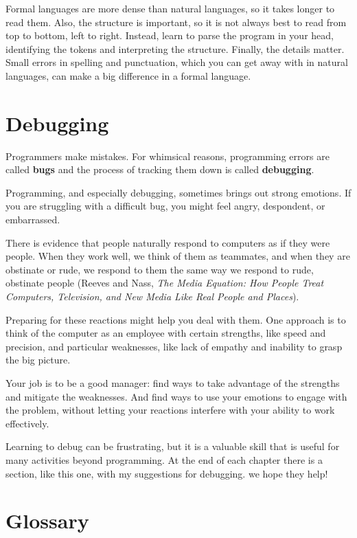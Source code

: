 Formal languages are more dense than natural languages, so it takes longer to
read them. Also, the structure is important, so it is not always best to read
from top to bottom, left to right. Instead, learn to parse the program in your
head, identifying the tokens and interpreting the structure. Finally, the
details matter. Small errors in spelling and punctuation, which you can get
away with in natural languages, can make a big difference in a formal
language.


\section{Debugging}

Programmers make mistakes. For whimsical reasons, programming errors are
called {\bf bugs} and the process of tracking them down is called {\bf
debugging}.

Programming, and especially debugging, sometimes brings out strong emotions.
If you are struggling with a difficult bug, you might  feel angry, despondent,
or embarrassed.

There is evidence that people naturally respond to computers as if they were
people. When they work well, we think of them as teammates, and when they are
obstinate or rude, we respond to them the same way we respond to rude,
obstinate people (Reeves and Nass, {\it The Media  Equation: How People
Treat Computers, Television, and New Media Like Real People and Places}).

Preparing for these reactions might help you deal with them. One approach is
to think of the computer as an employee with certain strengths, like speed and
precision, and particular weaknesses, like lack of empathy and inability to
grasp the big picture.

Your job is to be a good manager: find ways to take advantage of the strengths
and mitigate the weaknesses. And find ways to use your emotions to engage with
the problem, without letting your reactions interfere with your ability to
work effectively.

Learning to debug can be frustrating, but it is a valuable skill that is
useful for many activities beyond programming. At the end of each chapter
there is a section, like this one, with my suggestions for debugging. we hope
they help!


\section{Glossary}

